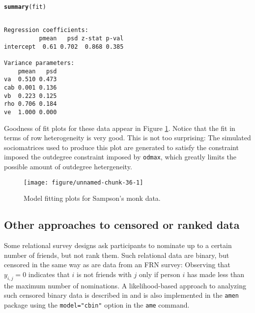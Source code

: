 \documentclass[11pt]{article}\usepackage[]{graphicx}\usepackage[]{color}
\makeatletter
\def\maxwidth{ %
  \ifdim\Gin@nat@width>\linewidth
    \linewidth
  \else
    \Gin@nat@width
  \fi
}
\newcommand{\hlstd}[1]{\textcolor[rgb]{0.345,0.345,0.345}{#1}}%
\newcommand{\hlkwd}[1]{\textcolor[rgb]{0.737,0.353,0.396}{\textbf{#1}}}%
\newenvironment{kframe}{%
 \def\at@end@of@kframe{}%
 \ifinner\ifhmode%
  \def\at@end@of@kframe{\end{minipage}}%
  \begin{minipage}{\columnwidth}%
 \fi\fi%
 \def\FrameCommand##1{\hskip\@totalleftmargin \hskip-\fboxsep
 \colorbox{shadecolor}{##1}\hskip-\fboxsep
     \hskip-\linewidth \hskip-\@totalleftmargin \hskip\columnwidth}%
 \MakeFramed {\advance\hsize-\width
   \@totalleftmargin\z@ \linewidth\hsize
   \@setminipage}}%
 {\par\unskip\endMakeFramed%
 \at@end@of@kframe}
\newenvironment{knitrout}{}{} %
\makeatother
\begin{document}
\begin{knitrout}\footnotesize
{}\color{fgcolor}\begin{kframe}
\begin{alltt}
\hlkwd{summary}\hlstd{(fit)}
\end{alltt}
\begin{verbatim}

Regression coefficients:
          pmean   psd z-stat p-val
intercept  0.61 0.702  0.868 0.385

Variance parameters:
    pmean   psd
va  0.510 0.473
cab 0.001 0.136
vb  0.223 0.125
rho 0.706 0.184
ve  1.000 0.000
\end{verbatim}
\end{kframe}
\end{knitrout}

Goodness of fit plots for these data appear in Figure 
\ref{fig:smonk}. Notice that the fit in terms of row heterogeneity is 
very good. This is not too surprising: 
The simulated sociomatrices used to produce this plot 
are generated to satisfy the constraint imposed 
the outdegree constraint imposed by {\tt odmax}, which 
greatly limits the possible amount of outdegree hetergeneity. 

\begin{figure}
\begin{knitrout}\footnotesize
{}\color{fgcolor}

{\centering \texttt{[image: figure/unnamed-chunk-36-1]} 

}



\end{knitrout}
\caption{Model fitting plots for Sampson's monk data.} 
\label{fig:smonk}
\end{figure}

\subsection{Other approaches to censored or ranked data}
Some relational survey designs ask participants to nominate 
up to a certain number of friends, but not rank them. Such relational data
are binary, but censored in the same way as are data from an FRN survey: 
Observing that $y_{i,j}=0$ indicates that $i$ is not friends with $j$ 
only if person $i$ has made less than the maximum number  of nominations. 
A likelihood-based approach to analyzing such 
censored binary data is described in 
\citet{hoff_fosdick_volfovsky_stovel_2013} and 
is also implemented in the {\tt amen} package
using the {\tt model="cbin"} option in the 
{\tt ame} command. 
\end{document}

